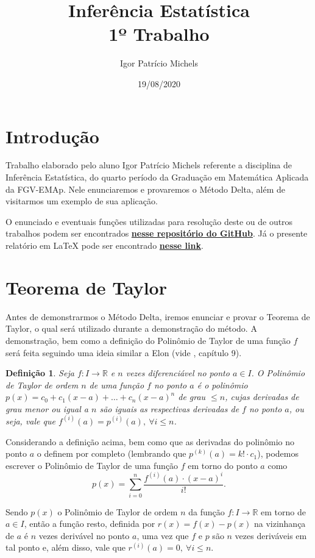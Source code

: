 \documentclass{article}
\title{Inferência Estatística \\ 1º Trabalho}
\author{Igor Patrício Michels}
\date{19/08/2020}
\newtheorem{definition}{Definição}
\begin{document}
\maketitle

\section*{Introdução}

Trabalho elaborado pelo aluno Igor Patrício Michels referente a disciplina de Inferência Estatística, do quarto período da Graduação em Matemática Aplicada da FGV-EMAp. Nele enunciaremos e provaremos o Método Delta, além de visitarmos um exemplo de sua aplicação.

O enunciado e eventuais funções utilizadas para resolução deste ou de outros trabalhos podem ser encontrados \href{https://github.com/IgorMichels/Statistical_Inference}{\textbf{nesse repositório do GitHub}}. Já o presente relatório em \LaTeX{} pode ser encontrado \href{https://www.overleaf.com/read/sdfnbcnthrms}{\textbf{nesse link}}.

\section*{Teorema de Taylor}

Antes de demonstrarmos o Método Delta, iremos enunciar e provar o Teorema de Taylor, o qual será utilizado durante a demonstração do método. A demonstração, bem como a definição do Polinômio de Taylor de uma função $f$ será feita seguindo uma ideia similar a Elon (vide \cite{elon}, capítulo 9).

\begin{definition}
    Seja $f : I \to \mathbb{R}$ e $n$ vezes diferenciável no ponto $a \in I$. O Polinômio de Taylor de ordem $n$ de uma função $f$ no ponto $a$ é o polinômio $p(x) = c_0 + c_1(x - a) + \dots + c_n(x - a)^n$ de grau $\leq n$, cujas derivadas de grau menor ou igual a $n$ são iguais as respectivas derivadas de $f$ no ponto $a$, ou seja, vale que $f^{(i)}(a) = p^{(i)}(a), ~\forall i\leq n$.
\end{definition}

Considerando a definição acima, bem como que as derivadas do polinômio no ponto $a$ o definem por completo (lembrando que $p^(k)(a) = k!\cdot c_1$), podemos escrever o Polinômio de Taylor de uma função $f$ em torno do ponto $a$ como
\[p(x) = \sum_{i = 0}^{n} \dfrac{f^{(i)}(a)\cdot (x - a)^i}{i!}.\]

Sendo $p(x)$ o Polinômio de Taylor de ordem $n$ da função $f : I \to \mathbb{R}$ em torno de $a \in I$, então a função resto, definida por $r(x) = f(x) - p(x)$ na vizinhança de $a$ é $n$ vezes derivável no ponto $a$, uma vez que $f$ e $p$ são $n$ vezes deriváveis em tal ponto e, além disso, vale que $r^{(i)}(a) = 0, ~\forall i \leq n$.
\end{document}

